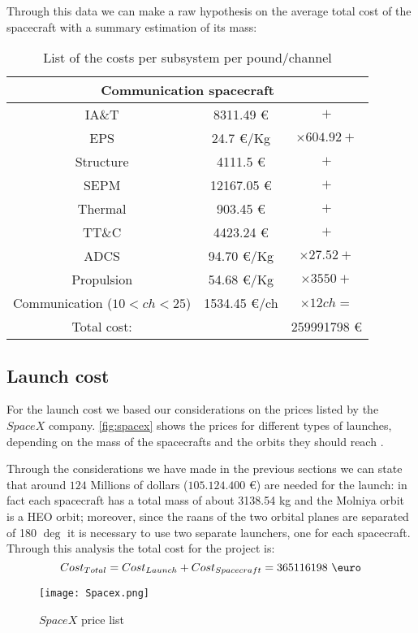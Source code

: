 	Through this data we can make a raw hypothesis on the average total cost of the spacecraft with a summary estimation of its mass:

	\begin{table}
		\centering
		\begin{tabular}{ccc}
		\toprule
		\multicolumn{3}{c}{Communication spacecraft}\\
		\midrule
		IA\&T       & 8311.49 \euro       & $+$\\
		EPS          & 24.7 \euro/Kg        & $\times 604.92 +$\\
		Structure   & 4111.5 \euro     & $+$\\
		SEPM        & 12167.05 \euro     & $+$\\
		Thermal    & 903.45 \euro        & $+$\\
		TT\&C       & 4423.24 \euro      & $+$\\
		ADCS        & 94.70 \euro/Kg     & $\times 27.52 +$\\
		Propulsion & 54.68   \euro/Kg   & $\times 3550 +$\\
		Communication ($10 < ch < 25$) & 1534.45 \euro/ch & $\times 12 ch =$\\
		\bottomrule
		Total cost:& & 259991798 \euro\\
		\end{tabular}
		\caption{List of the costs per subsystem per pound/channel}
		\label{tab:cost}
	\end{table}
\subsection{Launch cost}
For the launch cost we based our considerations on the prices listed by the $SpaceX$ company. \autoref{fig:spacex} shows the prices for different types of launches, depending on the mass of the spacecrafts and the orbits they should reach \cite{spacex}.

Through the considerations we have made in the previous sections we can state that around $124$ Millions of dollars ($105.124.400$ \euro) are needed for the launch: in fact each spacecraft has a total mass of about 3138.54 kg and the Molniya orbit is a HEO orbit; moreover, since the raans of the two orbital planes are separated of 180 $\deg$ it is necessary to use two separate launchers, one for each spacecraft.\\ 

Through this analysis the total cost for the project is:
\begin{equation}
Cost_{Total} = Cost_{Launch} + Cost_{Spacecraft} =  365116198
\text{ \euro}
\end{equation}

\begin{figure}[htbp]
\centering
\texttt{[image: Spacex.png]}
\caption{$SpaceX$ price list}
\label{fig:spacex}
\end{figure}
